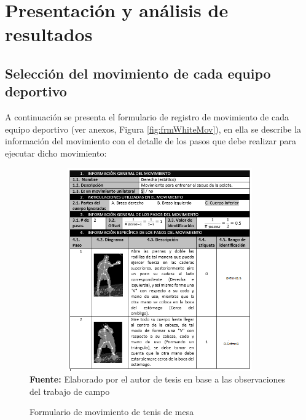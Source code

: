 \chapter{Presentaci\'on y an\'alisis de resultados}
\section{Selecci\'on del movimiento de cada equipo deportivo} \label{res:idMov}
A continuaci\'on se presenta el formulario de registro de movimiento de cada equipo deportivo (ver anexos, Figura \ref{fig:frmWhiteMov}), en ella se describe la informaci\'on del movimiento con el detalle de los pasos que debe realizar para ejecutar dicho movimiento:
\begin{figure}[H]
	\caption{Formulario de movimiento de tenis de mesa}
	\label{fig:frmMovTen}
	\centering
	\includegraphics[width=430px,height=330px]{graphics/resultados/movimientoTenis.PNG} \\
	\textbf{Fuente:} Elaborado por el autor de tesis en base a las observaciones del trabajo de campo
\end{figure}

